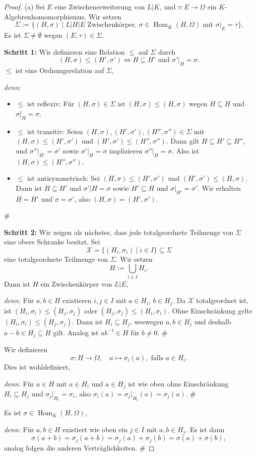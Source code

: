 \documentclass[a4paper, twoside, 11pt, ngerman]{report}
\newcommand{\calX}{\mathcal X}
\DeclareMathOperator{\Hom}{Hom}
\theoremstyle{definistyle}
\theoremstyle{remark}
\newenvironment{denn}%
  {\par\textit{denn:}}%
  {\hfill\#\par}
\begin{document}
\begin{proof}
(a) Sei $E$ eine Zwischenerweiterung von $L|K$, und $\tau \colon E \to \Omega$ ein $K$-Al\-ge\-bren\-homo\-morphismus. Wir setzen
\[
\Sigma := \{(H, \sigma) \mid L|H|E \text{ Zwischenkörper, } \sigma \in \Hom_K(H, \Omega)\text{ mit } \sigma|_E = \tau\}.
\]
Es ist $\Sigma \neq \emptyset$ wegen $(E, \tau) \in \Sigma$.

\textbf{Schritt 1:}
Wir definieren eine Relation $\leq$ auf $\Sigma$ durch
\[
(H, \sigma) \leq (H', \sigma') \iff H \subseteq H' \text{ und } \sigma'|_H = \sigma.
\]
$\leq$ ist eine Ordnungsrelation auf $\Sigma$,
\begin{denn}
\begin{itemize}
\item $\leq$ ist reflexiv: Für $(H, \sigma) \in \Sigma$ ist $(H, \sigma) \leq (H, \sigma)$ wegen $H \subseteq H$ und $\sigma|_H = \sigma$.
\item $\leq$ ist transitiv: Seien $(H, \sigma), (H', \sigma'), (H'', \sigma'') \in \Sigma$ mit $(H, \sigma) \leq (H', \sigma')$ und $(H', \sigma') \leq (H'', \sigma'')$. Dann gilt $H \subseteq H' \subseteq H''$, und $\sigma''|_{H'} = \sigma'$ sowie $\sigma'|_H = \sigma$ implizieren $\sigma''|_H = \sigma$. Also ist $(H, \sigma) \leq (H'', \sigma'')$.
\item $\leq$ ist antisymmetrisch: Sei $(H, \sigma) \leq (H', \sigma')$ und $(H', \sigma') \leq (H, \sigma)$. 
Dann ist $H\subseteq H'$ und $\sigma'|H=\sigma$ sowie $H'\subseteq H$ und $\sigma|_{H'}=\sigma'$.
Wir erhalten $H = H'$ und $\sigma = \sigma'$, also $(H, \sigma) = (H', \sigma')$.
\end{itemize}
\end{denn}
\textbf{Schritt 2:}
Wir zeigen als nächstes, dass jede totalgeordnete Teilmenge von $\Sigma$ eine obere Schranke besitzt.
Sei 
\[\calX=\{(H_i, \sigma_i) \mid i \in I\} \subseteq \Sigma\]
eine totalgeordnete Teilmenge von $\Sigma$. Wir setzen
\[H := \bigcup_{i \in I} H_i.\]
Dann ist $H$ ein Zwischenkörper von $L|E$, 
\begin{denn}
Für $a, b \in H$ existieren $i,j\in I$ mit $a\in H_i$, $b\in H_j$. Da $\calX$ totalgeordnet ist, ist $(H_i, \sigma_i) \leq (H_j, \sigma_j)$ oder $(H_j, \sigma_j) \leq (H_i, \sigma_i)$. Ohne Einschränkung gelte $(H_i, \sigma_i) \leq (H_j, \sigma_j)$. Dann ist $H_i\subseteq H_j$, weswegen $a,b\in H_j$ und deshalb $a-b\in H_j\subseteq H$ gilt.
Analog ist $ab^{-1}\in H$ für $b\neq0$. 
\end{denn}
Wir definieren
\[
\sigma\colon H \to \Omega,\quad a\mapsto \sigma_i(a), \text{ falls }a \in H_i. 
\]
Dies ist wohldefiniert,
\begin{denn}
Für $a\in H$ mit $a \in H_i$ und $a \in H_j$ ist wie oben ohne Einschränkung  $H_i \subseteq H_j$ und $\sigma_j|_{H_i}=\sigma_i$, also $\sigma_i(a)=\sigma_j|_{H_i}(a)=\sigma_j(a)$.
\end{denn}
Es ist $\sigma\in\Hom_K(H,\Omega)$,
\begin{denn}
Für $a, b \in H$ existiert wie oben ein $j\in I$ mit $a,b\in H_j$. Es ist dann 
\[
\sigma(a+b)=\sigma_j(a+b)=\sigma_j(a)+\sigma_j(b)=\sigma(a)+\sigma(b),
\]
analog folgen die anderen Verträglichkeiten.
\end{denn}


\end{proof}
\end{document}
